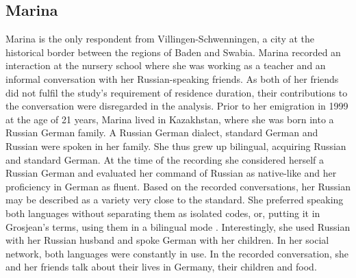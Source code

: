 \subsection{Marina}
Marina is the only respondent from Villingen-Schwenningen, a city at the historical border between the regions of  Baden and Swabia. Marina recorded an interaction at the nursery school where she was working as a teacher and an informal conversation with her Russian-speaking friends. As both of her friends did not fulfil the study's requirement of residence duration, their contributions to the conversation were disregarded in the analysis. Prior to her emigration in 1999 at the age of 21 years, Marina lived in Kazakhstan, where she was born into a Russian German family. A Russian German dialect, standard German and Russian were spoken in her family. She thus grew up bilingual, acquiring Russian and standard German. At the time of the recording she considered herself a Russian German and evaluated her command of Russian as native-like and her proficiency in German as fluent. Based on the recorded conversations, her Russian may be described as a variety very close to the standard. She preferred speaking both languages without separating them as isolated codes, or, putting it in Grosjean's terms, using them in a bilingual mode \citep[cf.][]{grosjean85}. Interestingly, she used Russian with her Russian husband and spoke German with her children. In her social network, both languages were constantly in use. In the recorded conversation, she and her friends talk about their lives in Germany, their children and food.

